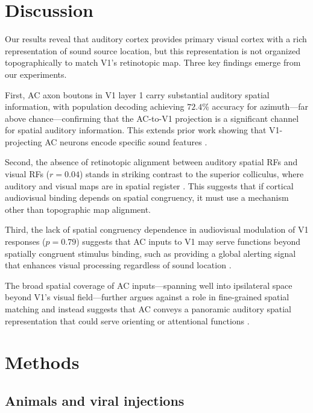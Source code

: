 \documentclass[11pt]{article}
\begin{document}
\section{Discussion}

Our results reveal that auditory cortex provides primary visual cortex with a rich representation of sound source location, but this representation is not organized topographically to match V1's retinotopic map. Three key findings emerge from our experiments.

First, AC axon boutons in V1 layer 1 carry substantial auditory spatial information, with population decoding achieving $72.4$\% accuracy for azimuth---far above chance---confirming that the AC-to-V1 projection is a significant channel for spatial auditory information. This extends prior work showing that V1-projecting AC neurons encode specific sound features \citep{bizley2007, king2009}.

Second, the absence of retinotopic alignment between auditory spatial RFs and visual RFs ($r = 0.04$) stands in striking contrast to the superior colliculus, where auditory and visual maps are in spatial register \citep{wallace1996, stein2008, knudsen2002}. This suggests that if cortical audiovisual binding depends on spatial congruency, it must use a mechanism other than topographic map alignment.

Third, the lack of spatial congruency dependence in audiovisual modulation of V1 responses ($p = 0.79$) suggests that AC inputs to V1 may serve functions beyond spatially congruent stimulus binding, such as providing a global alerting signal that enhances visual processing regardless of sound location \citep{iurilli2012, ibrahim2016}.

The broad spatial coverage of AC inputs---spanning well into ipsilateral space beyond V1's visual field---further argues against a role in fine-grained spatial matching and instead suggests that AC conveys a panoramic auditory spatial representation that could serve orienting or attentional functions \citep{middlebrooks1994, ghazanfar2006}.

\section{Methods}

\subsection{Animals and viral injections}
\end{document}
